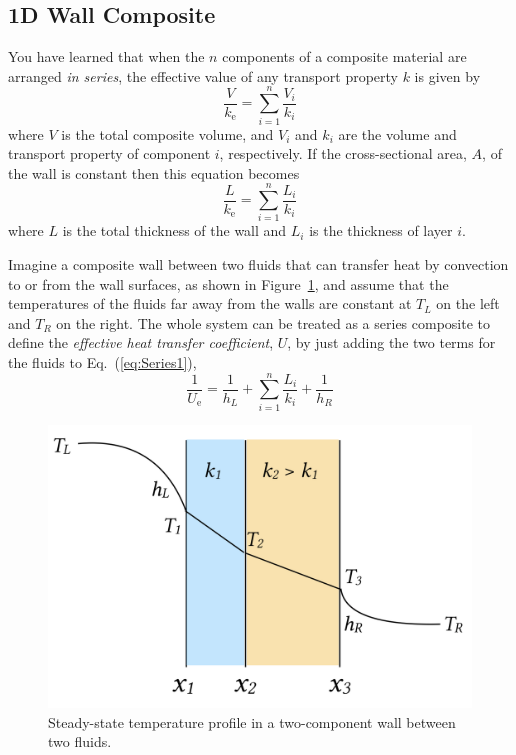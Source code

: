 \documentclass{article}
\begin{document}
\subsection*{1D Wall Composite}
You have learned that when the $n$ components of a composite material are arranged
\textit{in series}, the effective value of any transport property $k$ is given by
\begin{equation}
    \frac{V}{k_{\text{e}}} = \sum_{i=1}^n \frac{V_i}{k_i}
    \label{eq:Series1}
\end{equation}
where $V$ is the total composite volume, and $V_i$ and $k_i$ are the volume and transport property
of component $i$, respectively.  If the cross-sectional area, $A$, of the wall is constant then this
equation becomes
\begin{equation}
    \frac{L}{k_{\text{e}}} = \sum_{i=1}^n \frac{L_i}{k_i}
    \label{eq:Series2}
\end{equation}
where $L$ is the total thickness of the wall and $L_i$ is the thickness of layer $i$.

Imagine a composite wall between two fluids that can transfer heat by convection to or
from the wall surfaces, as shown in Figure~\ref{fig:twowallfluids}, and assume that the
temperatures of the fluids far away from the walls are constant at $T_L$ on the left
and $T_R$ on the right.
The whole system can be treated as a series composite to define the
\textit{effective heat transfer coefficient}, $U$, by just adding the two terms for the
fluids to Eq.~(\ref{eq:Series1}),
\begin{equation}
    \frac{1}{U_{\text{e}}} = \frac{1}{h_L} + \sum_{i=1}^n \frac{L_i}{k_i} + \frac{1}{h_R}
    \label{eq:Series3}
\end{equation}

\begin{figure}
    \centering\includegraphics[scale=0.3]{Figure02.png}
    \caption{\label{fig:twowallfluids} Steady-state temperature profile in a
        two-component wall between two fluids.}
\end{figure}
\end{document}
